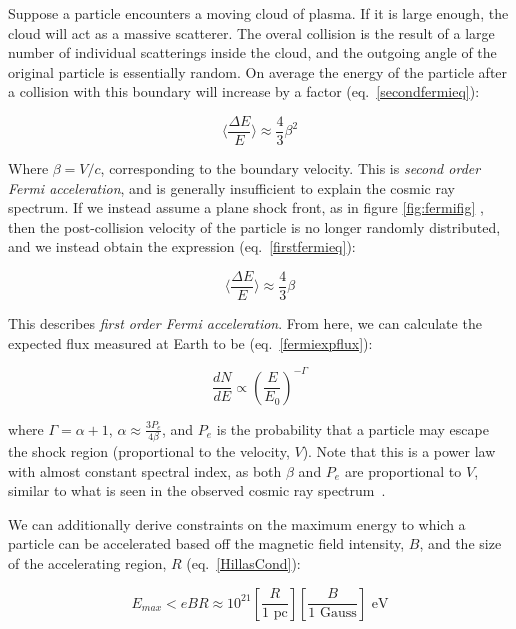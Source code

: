 Suppose a particle encounters a moving cloud of plasma. If it is large enough, the cloud will act as a massive scatterer. The overal collision is the result of a large number of individual scatterings inside the cloud, and the outgoing angle of the original particle is essentially random. On average the energy of the particle after a collision with this boundary will increase by a factor (eq.~\ref{secondfermieq}):

\begin{equation}
    \langle\frac{\Delta E}{E}\rangle \approx \frac{4}{3}\beta^2
\label{secondfermieq}
\end{equation}

Where $\beta=V/c$, corresponding to the boundary velocity. This is \textit{second order Fermi acceleration}, and is generally insufficient to explain the cosmic ray spectrum. If we instead assume a plane shock front, as in figure \ref{fig:fermifig} , then the post-collision velocity of the particle is no longer randomly distributed, and we instead obtain the expression (eq.~\ref{firstfermieq}):

\begin{equation}
    \langle\frac{\Delta E}{E}\rangle \approx \frac{4}{3}\beta
\label{firstfermieq}
\end{equation}

This describes \textit{first order Fermi acceleration}. From here, we can calculate the expected flux measured at Earth to be (eq.~\ref{fermiexpflux}):

\begin{equation}
    \frac{dN}{dE} \propto (\frac{E}{E_0})^{-\Gamma}
\label{fermiexpflux}
\end{equation}

where $\Gamma=\alpha+1$, $\alpha\approx \frac{3P_e}{4 \beta}$, and $P_e$ is the probability that a particle may escape the shock region (proportional to the velocity, $V$). Note that this is a power law with almost constant spectral index, as both $\beta$ and $P_e$ are proportional to $V$, similar to what is seen in the observed cosmic ray spectrum~\cite{pimenta_partphys}. 

We can additionally derive constraints on the maximum energy to which a particle can be accelerated based off the magnetic field intensity, $B$, and the size of the accelerating region, $R$ (eq.~\ref{HillasCond}):

\begin{equation}
    E_{max} < eBR \approx 10^{21} [\frac{R}{\textrm{1 pc}}][\frac{B}{\textrm{1 Gauss}}] \textrm{ eV}
\label{HillasCond}
\end{equation}

